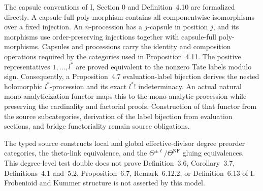 \begin{definition}
  \label{def:source-processions}
  \leanok
  The capsule conventions of \IUT{} I, Section 0 and Definition~4.10 are
  formalized directly.  A capsule-full poly-morphism contains all
  componentwise isomorphisms over a fixed injection.  An \(n\)-procession has
  a \(j\)-capsule in position \(j\), and its morphisms use order-preserving
  injections together with capsule-full poly-morphisms.  Capsules and
  processions carry the identity and composition operations required by the
  categories used in Proposition~4.11.  The positive representatives
  \(1,\ldots,l^\ast\) are proved equivalent to the nonzero Tate labels modulo
  sign.  Consequently, a Proposition~4.7 evaluation-label bijection derives
  the nested holomorphic \(l^\ast\)-procession and its exact \(l^\ast!\)
  indeterminacy.  An actual natural mono-analyticization functor maps this to
  the mono-analytic procession while preserving the cardinality and factorial
  proofs.  Construction of that functor from the source subcategories,
  derivation of the label bijection from evaluation sections, and bridge
  functoriality remain source obligations.
\end{definition}

\begin{definition}
  \label{def:iut-i-theater-realization}
  \leanok
  The typed source constructs local and global effective-divisor
  degree preorder categories, the theta-link equivalence, and the
  \(\Theta^{\pm\ell}/\Theta^{\mathrm{NF}}\) gluing equivalences.  This
  degree-level test double does not prove Definition~3.6, Corollary~3.7,
  Definitions~4.1 and~5.2, Proposition~6.7, Remark~6.12.2, or
  Definition~6.13 of \IUT{} I.  Frobenioid and Kummer structure is not
  asserted by this model.
\end{definition}

